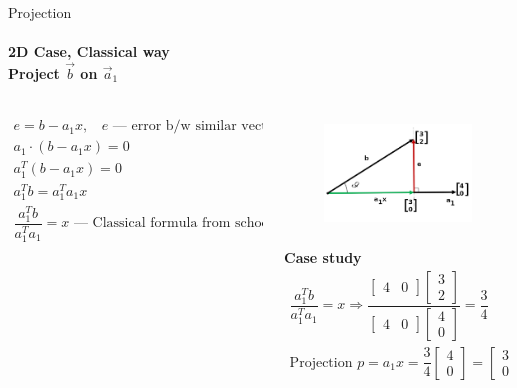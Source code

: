 \documentclass[aspectratio=169]{beamer}
\begin{document}
\begin{frame}[t]{Projection}
    \framesubtitle{2D Case, Classical way \\ Project $\vec{b}$ on $\vec{a}_1$}
    \vspace{-0.8cm}
    \begin{columns}[T,onlytextwidth]
        \begin{column}{0.49\textwidth}
            \begin{align*}
                e = b -a_1x,\ \text{ $e$ --- error b/w similar vectors} \\
                a_1 \cdot (b-a_1x)=0 \\
                a_1^T(b-a_1x)=0 \\
                a_1^Tb = a_1^Ta_1x \\
                \dfrac{a_1^Tb}{a_1^Ta_1} = x \text{ --- Classical formula from school}
                \end{align*}
        \end{column}
        \begin{column}{0.49\textwidth}
            \vspace{-1.8cm}
            \begin{figure}[H]
                \centering\includegraphics[height=3cm,width=1\textwidth,keepaspectratio]{resources/fig1.png}
                \label{fig:resources/fig1.png}
            \end{figure}
            \vspace{-1cm}
            \textbf{Case study}
            \begin{align*}
            \dfrac{a_1^Tb}{a_1^Ta_1} = x \Rightarrow
            \dfrac{\begin{bmatrix}4&0\end{bmatrix}\begin{bmatrix}3\\2\end{bmatrix}}{\begin{bmatrix}4&0\end{bmatrix}\begin{bmatrix}4\\0\end{bmatrix}}=\dfrac{3}{4} \\
            \text{Projection } p=a_1x = \dfrac{3}{4} \begin{bmatrix}4\\0\end{bmatrix} = \begin{bmatrix}3\\0\end{bmatrix}
            \end{align*}
        \end{column}
    \end{columns}
\end{frame}
\end{document}
